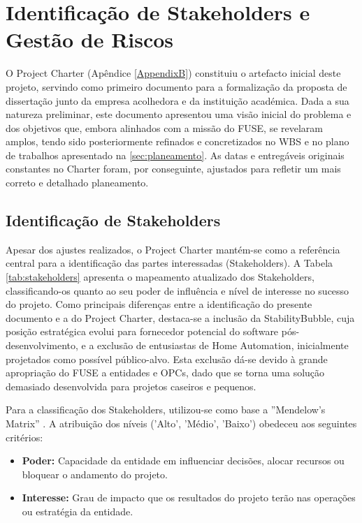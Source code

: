 
\chapter{Identificação de Stakeholders e Gestão de Riscos} %

\label{AppendixD} %

O Project Charter (Apêndice \ref{AppendixB}) constituiu o artefacto inicial deste projeto, servindo como primeiro documento para a formalização da proposta de dissertação junto da empresa acolhedora e da instituição académica. Dada a sua natureza preliminar, este documento apresentou uma visão inicial do problema e dos objetivos que, embora alinhados com a missão do \gls{FUSE}, se revelaram amplos, tendo sido posteriormente refinados e concretizados no \gls{WBS} e no plano de trabalhos apresentado na \autoref{sec:planeamento}. As datas e entregáveis originais constantes no Charter foram, por conseguinte, ajustados para refletir um mais correto e detalhado planeamento.

\section{Identificação de Stakeholders}
\label{subsec:stakeholder_identification}

Apesar dos ajustes realizados, o Project Charter mantém-se como a referência central para a identificação das partes interessadas (Stakeholders). A Tabela \ref{tab:stakeholders} apresenta o mapeamento atualizado dos Stakeholders, classificando-os quanto ao seu poder de influência e nível de interesse no sucesso do projeto. Como principais diferenças entre a identificação do presente documento e a do Project Charter, destaca-se a inclusão da StabilityBubble, cuja posição estratégica evolui para fornecedor potencial do software pós-desenvolvimento, e a exclusão de entusiastas de Home Automation, inicialmente projetados como possível público-alvo. Esta exclusão dá-se devido à grande apropriação do \gls{FUSE} a entidades e \glspl{OPC}, dado que se torna uma solução demasiado desenvolvida para projetos caseiros e pequenos.

Para a classificação dos Stakeholders, utilizou-se como base a ''Mendelow's Matrix'' \cite{Mendelow1981}. A atribuição dos níveis ('Alto', 'Médio', 'Baixo') obedeceu aos seguintes critérios:

\begin{itemize}
    \item \textbf{Poder:} Capacidade da entidade em influenciar decisões, alocar recursos ou bloquear o andamento do projeto.
    \item \textbf{Interesse:} Grau de impacto que os resultados do projeto terão nas operações ou estratégia da entidade.
\end{itemize}

